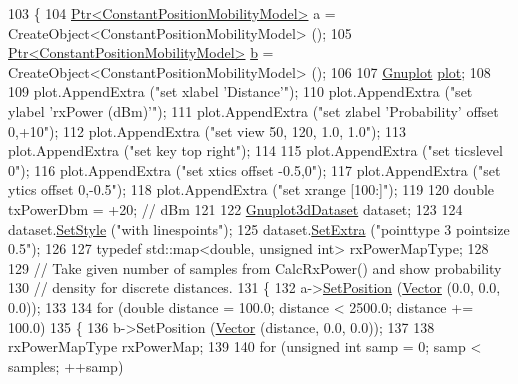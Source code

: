 \begin{DoxyCode}
103 \{
104   \hyperlink{classns3_1_1Ptr}{Ptr<ConstantPositionMobilityModel>} a = 
      CreateObject<ConstantPositionMobilityModel> ();
105   \hyperlink{classns3_1_1Ptr}{Ptr<ConstantPositionMobilityModel>} \hyperlink{buildings__pathloss_8m_a21ad0bd836b90d08f4cf640b4c298e7c}{b} = 
      CreateObject<ConstantPositionMobilityModel> ();
106 
107   \hyperlink{classns3_1_1Gnuplot}{Gnuplot} \hyperlink{lte__amc_8m_a5942306abe9f005572e4344e3cdef528}{plot};
108 
109   plot.AppendExtra (\textcolor{stringliteral}{"set xlabel 'Distance'"});
110   plot.AppendExtra (\textcolor{stringliteral}{"set ylabel 'rxPower (dBm)'"});
111   plot.AppendExtra (\textcolor{stringliteral}{"set zlabel 'Probability' offset 0,+10"});
112   plot.AppendExtra (\textcolor{stringliteral}{"set view 50, 120, 1.0, 1.0"});
113   plot.AppendExtra (\textcolor{stringliteral}{"set key top right"});
114 
115   plot.AppendExtra (\textcolor{stringliteral}{"set ticslevel 0"});
116   plot.AppendExtra (\textcolor{stringliteral}{"set xtics offset -0.5,0"});
117   plot.AppendExtra (\textcolor{stringliteral}{"set ytics offset 0,-0.5"});
118   plot.AppendExtra (\textcolor{stringliteral}{"set xrange [100:]"});
119 
120   \textcolor{keywordtype}{double} txPowerDbm = +20; \textcolor{comment}{// dBm}
121 
122   \hyperlink{classns3_1_1Gnuplot3dDataset}{Gnuplot3dDataset} dataset;
123 
124   dataset.\hyperlink{classns3_1_1Gnuplot3dDataset_ae99331e66e6d5a39fdf407875be56f1f}{SetStyle} (\textcolor{stringliteral}{"with linespoints"});
125   dataset.\hyperlink{classns3_1_1GnuplotDataset_a60d9bf5911e70a58ec11b35969d41fa6}{SetExtra} (\textcolor{stringliteral}{"pointtype 3 pointsize 0.5"});
126 
127   \textcolor{keyword}{typedef} std::map<double, unsigned int> rxPowerMapType;
128 
129   \textcolor{comment}{// Take given number of samples from CalcRxPower() and show probability}
130   \textcolor{comment}{// density for discrete distances.}
131   \{
132     a->\hyperlink{classns3_1_1MobilityModel_ac584b3d5a309709d2f13ed6ada1e7640}{SetPosition} (\hyperlink{classns3_1_1Vector3D_a7e59b47bc94c9cb1dadff68c1d0112d8}{Vector} (0.0, 0.0, 0.0));
133 
134     \textcolor{keywordflow}{for} (\textcolor{keywordtype}{double} distance = 100.0; distance < 2500.0; distance += 100.0)
135       \{
136         b->SetPosition (\hyperlink{classns3_1_1Vector3D_a7e59b47bc94c9cb1dadff68c1d0112d8}{Vector} (distance, 0.0, 0.0));
137 
138         rxPowerMapType rxPowerMap;
139 
140         \textcolor{keywordflow}{for} (\textcolor{keywordtype}{unsigned} \textcolor{keywordtype}{int} samp = 0; samp < samples; ++samp)

\end{DoxyCode}
